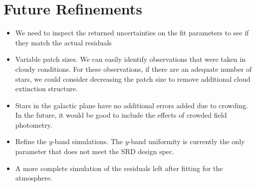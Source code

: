\documentclass[12pt,preprint]{aastex}
\begin{document}
\section{Future Refinements}
\begin{itemize}
\item{We need to inspect the returned uncertainties on the fit parameters to see if they match the actual residuals}
\item{Variable patch sizes.  We can easily identify observations that were taken in cloudy conditions.  For these observations, if there are an adequate number of stars, we could consider decreasing the patch size to remove additional cloud extinction structure.}
\item{Stars in the galactic plane have no additional errors added due to crowding.  In the future, it would be good to include the effects of crowded field photometry.  }
\item{Refine the $y$-band simulations.  The $y$-band uniformity is currently the only parameter that does not meet the SRD design spec.}
\item{A more complete simulation of the residuals left after fitting for the atmosphere.}
\end{itemize}






\appendix

\end{document}
